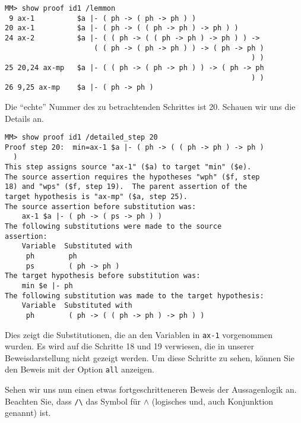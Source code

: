 \begin{verbatim}
MM> show proof id1 /lemmon
 9 ax-1          $a |- ( ph -> ( ph -> ph ) )
20 ax-1          $a |- ( ph -> ( ( ph -> ph ) -> ph ) )
24 ax-2          $a |- ( ( ph -> ( ( ph -> ph ) -> ph ) ) ->
                     ( ( ph -> ( ph -> ph ) ) -> ( ph -> ph )
                                                          ) )
25 20,24 ax-mp   $a |- ( ( ph -> ( ph -> ph ) ) -> ( ph -> ph
                                                          ) )
26 9,25 ax-mp    $a |- ( ph -> ph )
\end{verbatim}

Die "`echte"' Nummer des zu betrachtenden Schrittes ist 20.  Schauen wir uns die Details an.

\begin{verbatim}
MM> show proof id1 /detailed_step 20
Proof step 20:  min=ax-1 $a |- ( ph -> ( ( ph -> ph ) -> ph )
  )
This step assigns source "ax-1" ($a) to target "min" ($e).
The source assertion requires the hypotheses "wph" ($f, step
18) and "wps" ($f, step 19).  The parent assertion of the
target hypothesis is "ax-mp" ($a, step 25).
The source assertion before substitution was:
    ax-1 $a |- ( ph -> ( ps -> ph ) )
The following substitutions were made to the source
assertion:
    Variable  Substituted with
     ph        ph
     ps        ( ph -> ph )
The target hypothesis before substitution was:
    min $e |- ph
The following substitution was made to the target hypothesis:
    Variable  Substituted with
     ph        ( ph -> ( ( ph -> ph ) -> ph ) )
\end{verbatim}

Dies zeigt die Substitutionen, die an den Variablen in \texttt{ax-1} vorgenommen wurden.  Es wird auf die Schritte 18 und 19 verwiesen, die in unserer Beweisdarstellung nicht gezeigt werden.  Um diese Schritte zu sehen, können Sie den Beweis mit der Option \texttt{all} anzeigen. 

Sehen wir uns nun einen etwas fortgeschritteneren Beweis der Aussagenlogik an.  Beachten Sie, dass \verb+/\+ das Symbol für $\wedge$ (logisches {\sc und}, auch Konjunktion genannt) ist.  

